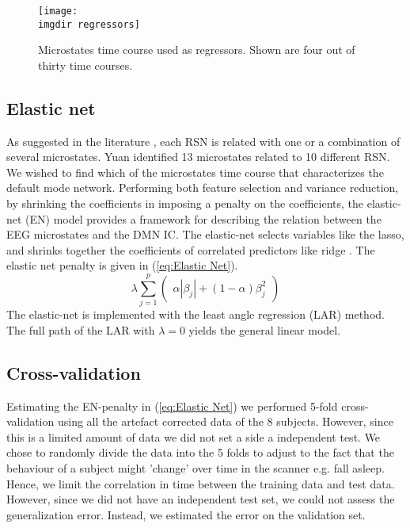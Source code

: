 \documentclass{article}
\newcommand{\imgdir}{Images/} %
\begin{document}
\begin{figure}[!ht]
    \centering
    \texttt{[image: \\imgdir regressors]}
    \caption{Microstates time course used as regressors. Shown are four out of thirty time courses.}
    \label{fig:regressors}
\end{figure}
\subsection{Elastic net}
As suggested in the literature \cite{Yuan20122062}, each RSN is related with one or a combination of several microstates. Yuan identified 13 microstates related to 10 different RSN. We wished to find which of the microstates time course that characterizes the default mode network. Performing both feature selection and variance reduction, by shrinking the coefficients in imposing a penalty on the coefficients, the elastic-net (EN) model \cite{hastie01} provides a framework for  describing the relation between the EEG microstates and the DMN IC.
The elastic-net selects variables like the lasso, and shrinks together the coefficients of correlated predictors like ridge \cite{hastie01}. The elastic net penalty is given in (\ref{eq:Elastic Net}).
\begin{equation}
\label{eq:Elastic Net}
\lambda \sum_{j=1}^p
\begin{pmatrix}
\alpha |\beta_j| + (1-\alpha) \beta_j^2
\end{pmatrix}
\end{equation}
The elastic-net is implemented with the least angle regression (LAR) method. The full path of the LAR with $\lambda=0$ yields the general linear model.


\subsection{Cross-validation}
Estimating the EN-penalty in (\ref{eq:Elastic Net}) we performed 5-fold cross-validation using all the artefact corrected data of the 8 subjects. However, since this is a limited amount of data we did not set a side a independent test.
We chose to randomly divide the data into the 5 folds to adjust to the fact that the behaviour of a subject might 'change' over time in the scanner e.g. fall asleep. Hence, we limit the correlation in time between the training data and test data. However, since we did not have an independent test set, we could not assess the generalization error. Instead, we estimated the error on the validation set.
\end{document}
